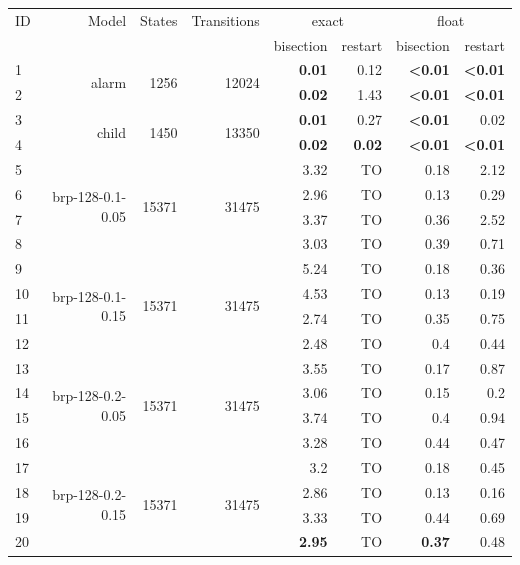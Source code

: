 \begin{longtable}{lrr@{\hskip 12pt}r@{\hskip 12pt}r@{\hskip 12pt}r@{\hskip 12pt}r@{\hskip 12pt}r}
\toprule
ID & Model & States & Transitions & \multicolumn{2}{c}{exact} & \multicolumn{2}{c}{float} \\
\cmidrule(lr){5-6}\cmidrule(lr){7-8}
 & & &  & bisection & restart & bisection & restart \\
\midrule
\endhead
1 & \multirow{2}{*}{alarm} & \multirow{2}{*}{1256} & \multirow{2}{*}{12024} & \textbf{0.01} & 0.12 & \textbf{<0.01} & \textbf{<0.01} \\
2 &  &  &  & \textbf{0.02} & 1.43 & \textbf{<0.01} & \textbf{<0.01} \\
\cmidrule{5-8}
3 & \multirow{2}{*}{child} & \multirow{2}{*}{1450} & \multirow{2}{*}{13350} & \textbf{0.01} & 0.27 & \textbf{<0.01} & 0.02 \\
4 &  &  &  & \textbf{0.02} & \textbf{0.02} & \textbf{<0.01} & \textbf{<0.01} \\
\midrule
5 & \multirow{4}{*}{brp-128-0.1-0.05} & \multirow{4}{*}{15371} & \multirow{4}{*}{31475} & 3.32 & TO & 0.18 & 2.12 \\
6 &  &  &  & 2.96 & TO & 0.13 & 0.29 \\
7 &  &  &  & 3.37 & TO & 0.36 & 2.52 \\
8 &  &  &  & 3.03 & TO & 0.39 & 0.71 \\
\cmidrule{5-8}
9 & \multirow{4}{*}{brp-128-0.1-0.15} & \multirow{4}{*}{15371} & \multirow{4}{*}{31475} & 5.24 & TO & 0.18 & 0.36 \\
10 &  &  &  & 4.53 & TO & 0.13 & 0.19 \\
11 &  &  &  & 2.74 & TO & 0.35 & 0.75 \\
12 &  &  &  & 2.48 & TO & 0.4 & 0.44 \\
\cmidrule{5-8}
13 & \multirow{4}{*}{brp-128-0.2-0.05} & \multirow{4}{*}{15371} & \multirow{4}{*}{31475} & 3.55 & TO & 0.17 & 0.87 \\
14 &  &  &  & 3.06 & TO & 0.15 & 0.2 \\
15 &  &  &  & 3.74 & TO & 0.4 & 0.94 \\
16 &  &  &  & 3.28 & TO & 0.44 & 0.47 \\
\cmidrule{5-8}
17 & \multirow{4}{*}{brp-128-0.2-0.15} & \multirow{4}{*}{15371} & \multirow{4}{*}{31475} & 3.2 & TO & 0.18 & 0.45 \\
18 &  &  &  & 2.86 & TO & 0.13 & 0.16 \\
19 &  &  &  & 3.33 & TO & 0.44 & 0.69 \\
20 &  &  &  & \textbf{2.95} & TO & \textbf{0.37} & 0.48 \\

\end{longtable}
